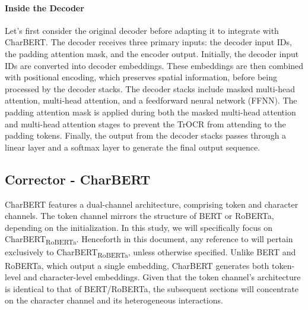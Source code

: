 
\paragraph*{Inside the Decoder}
\label{par:3_inside_the_decoder}
Let's first consider the original decoder before adapting it to integrate with CharBERT. The decoder receives three primary inputs: the decoder input IDs, the padding attention mask, and the encoder output. Initially, the decoder input IDs are converted into decoder embeddings. These embeddings are then combined with positional encoding, which preserves spatial information, before being processed by the decoder stacks. The decoder stacks include masked multi-head attention, multi-head attention, and a feedforward neural network (FFNN). The padding attention mask is applied during both the masked multi-head attention and multi-head attention stages to prevent the TrOCR from attending to the padding tokens. Finally, the output from the decoder stacks passes through a linear layer and a softmax layer to generate the final output sequence.

\subsection{Corrector - CharBERT}
\label{subsec:3_corrector_charbert}
CharBERT features a dual-channel architecture, comprising token and character channels. The token channel mirrors the structure of BERT or RoBERTa, depending on the initialization. In this study, we will specifically focus on CharBERT\textsubscript{RoBERTa}. Henceforth in this document, any reference to  will pertain exclusively to CharBERT\textsubscript{RoBERTa}, unless otherwise specified. Unlike BERT and RoBERTa, which output a single embedding, CharBERT generates both token-level and character-level embeddings. Given that the token channel's architecture is identical to that of BERT/RoBERTa, the subsequent sections will concentrate on the character channel and its heterogeneous interactions.

